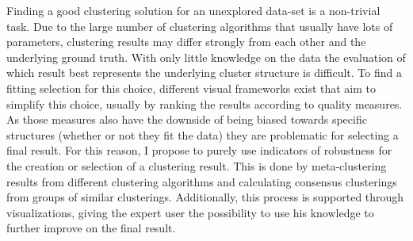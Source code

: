 \iffalse  \fi

Finding a good clustering solution for an unexplored data-set is a non-trivial task. Due to the large number of clustering algorithms that usually have lots of parameters, clustering results may differ strongly from each other and the underlying ground truth. With only little knowledge on the data the evaluation of which result best represents the underlying cluster structure is difficult. To find a fitting selection for this choice, different visual frameworks exist that aim to simplify this choice, usually by ranking the results according to quality measures. As those measures also have the downside of being biased towards specific structures (whether or not they fit the data) they are problematic for selecting a final result. For this reason, I propose to purely use indicators of robustness for the creation or selection of a clustering result. This is done by meta-clustering results from different clustering algorithms and calculating consensus clusterings from groups of similar clusterings. Additionally, this process is supported through visualizations, giving the expert user the possibility to use his knowledge to further improve on the final result.
